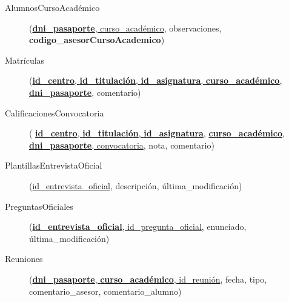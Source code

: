   \begin{description}
    \item[AlumnosCursoAcadémico] \begin{flushleft}(\underline{\textbf{dni\_pasaporte},
    curso\_académico}, observaciones, \textbf{codigo\_asesorCursoAcademico})\end{flushleft}
  \end{description}

  \begin{description}
    \item[Matrículas] \begin{flushleft}(\underline{\textbf{id\_centro},
    \textbf{id\_titulación}, \textbf{id\_asignatura},
    \textbf{curso\_académico},} \underline{\textbf{dni\_pasaporte}},
     comentario)\end{flushleft}
  \end{description}

  \begin{description}
    \item[CalificacionesConvocatoria] \begin{flushleft}(
    \underline{\textbf{id\_centro}, \textbf{id\_titulación},
    \textbf{id\_asignatura},} \underline{\textbf{curso\_académico},
    \textbf{dni\_pasaporte}, convocatoria}, nota, comentario)\end{flushleft}
  \end{description}

  \begin{description}
    \item[PlantillasEntrevistaOficial] \begin{flushleft}(\underline{id\_entrevista\_oficial}, descripción,
    última\_modificación)\end{flushleft}
  \end{description}

  \begin{description}
    \item[PreguntasOficiales] \begin{flushleft}(\underline{\textbf{id\_entrevista\_oficial},
    id\_pregunta\_oficial}, enunciado, última\_modificación)\end{flushleft}
  \end{description}

  \begin{description}
    \item[Reuniones] \begin{flushleft}(\underline{\textbf{dni\_pasaporte},
    \textbf{curso\_académico}, id\_reunión}, fecha, tipo,
    comentario\_asesor, comentario\_alumno)\end{flushleft}
  \end{description}


